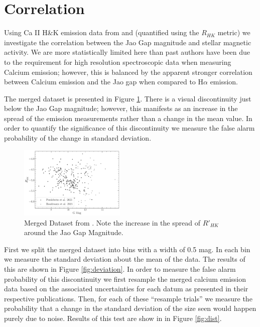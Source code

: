 \section{Correlation}\label{sec:results}
Using Ca II H\&K emission data from \citet{Boudreaux2022} and
\citet{Perdelwitz2021} (quantified using the $R_{HK}$ metric) we investigate
the correlation between the Jao Gap magnitude and stellar magnetic activity. We
are more statistically limited here than past authors have been due to
the requirement for high resolution spectroscopic data when measuring Calcium
emission; however, this is balanced by the apparent stronger correlation between
Calcium emission and the Jao gap when compared to H$\alpha$ emission. 

The merged dataset is presented in Figure \ref{fig:mergedData}. There is a
visual discontinuity just below the Jao Gap magnitude; however, this
manifests as an increase in the spread of the emission measurements rather than
a change in the mean value. In order to quantify the significance of this
discontinuity we measure the false alarm probability of the change in standard
deviation.

\begin{figure}
  \centering
  \includegraphics[width=0.45\textwidth]{figures/Combined.pdf}
  \caption{Merged Dataset from \citet{Boudreaux2022, Perdelwitz2021}. Note the
  increase in the spread of $R'_{HK}$ around the Jao Gap Magnitude.}
  \label{fig:mergedData}
\end{figure}

First we split the merged dataset into bins with a width of 0.5 mag. In each bin we
measure the standard deviation about the mean of the data. The results of this
are shown in Figure \ref{fig:deviation}. In order to measure the false alarm
probability of this discontinuity we first resample the merged calcium
emission data based on the associated uncertainties for each datum as
presented in their respective publications. Then, for each of these ``resample
trials'' we measure the probability that a change in the standard deviation of
the size seen would happen purely due to noise. Results of this test are show in
in Figure \ref{fig:dist}. 

